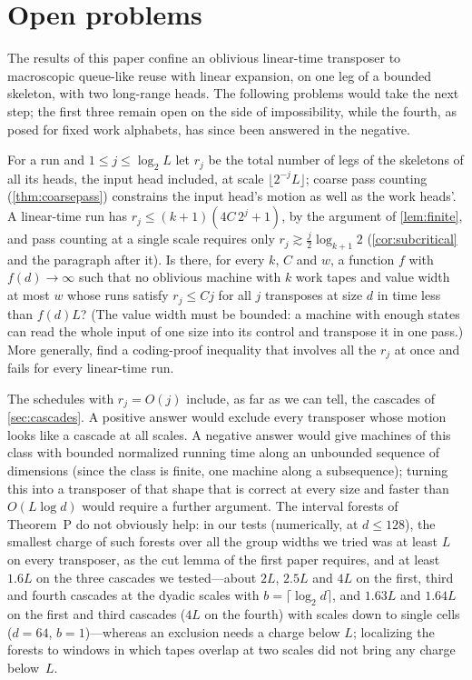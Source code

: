 \section{Open problems}\label{sec:open}

The results of this paper confine an oblivious linear-time transposer to macroscopic queue-like reuse with linear expansion, on one
leg of a bounded skeleton, with two long-range heads. The following problems would take the next step; the first three remain open on
the side of impossibility, while the fourth, as posed for fixed work alphabets, has since been answered in the negative.

\begin{problem}\label{prob:multiscale}
For a run and $1\le j\le\log_2L$ let $r_j$ be the total number of legs of the skeletons of all its heads, the input head included, at scale
$\lfloor2^{-j}L\rfloor$; coarse pass counting (\cref{thm:coarsepass}) constrains the input head's motion as well as the work heads'. A
linear-time run has $r_j\le(k+1)(4C\,2^j+1)$, by the argument of \cref{lem:finite}, and pass counting at a single scale requires only $r_j\gtrsim\frac j2\log_{k+1}2$
(\cref{cor:subcritical} and the paragraph after it). Is there, for every $k$, $C$ and $w$, a function $f$ with $f(d)\to\infty$ such that no oblivious machine with $k$ work tapes
and value width at most $w$ whose runs satisfy $r_j\le Cj$ for all $j$ transposes at size $d$ in time less than $f(d)L$? (The value width
must be bounded: a machine with enough states can read the whole input of one size into its control and transpose it in one pass.) More generally, find a coding-proof inequality
that involves all the $r_j$ at once and fails for every linear-time run.
\end{problem}

The schedules with $r_j=O(j)$ include, as far as we can tell, the cascades of \cref{sec:cascades}. A positive answer would exclude every
transposer whose motion looks like a cascade at all scales. A negative answer would give machines of this class with bounded normalized
running time along an unbounded sequence of dimensions (since the class is finite, one machine along a subsequence); turning this into a
transposer of that shape that is correct at every size and faster than $O(L\log d)$ would require a further argument. The interval forests of Theorem~P do not obviously help: in our tests (numerically, at $d\le128$), the smallest charge of such forests
over all the group widths we tried was at least $L$ on every transposer, as the cut lemma of the first paper requires, and at least $1.6L$ on
the three cascades we tested---about $2L$, $2.5L$ and $4L$ on the first, third and fourth cascades at the dyadic scales with
$b=\lceil\log_2 d\rceil$, and $1.63L$ and $1.64L$ on the first and third cascades ($4L$ on the fourth) with scales down to single cells
($d=64$, $b=1$)---whereas an exclusion needs a charge below $L$; localizing the forests to windows in which tapes overlap at two scales did
not bring any charge below~$L$.


